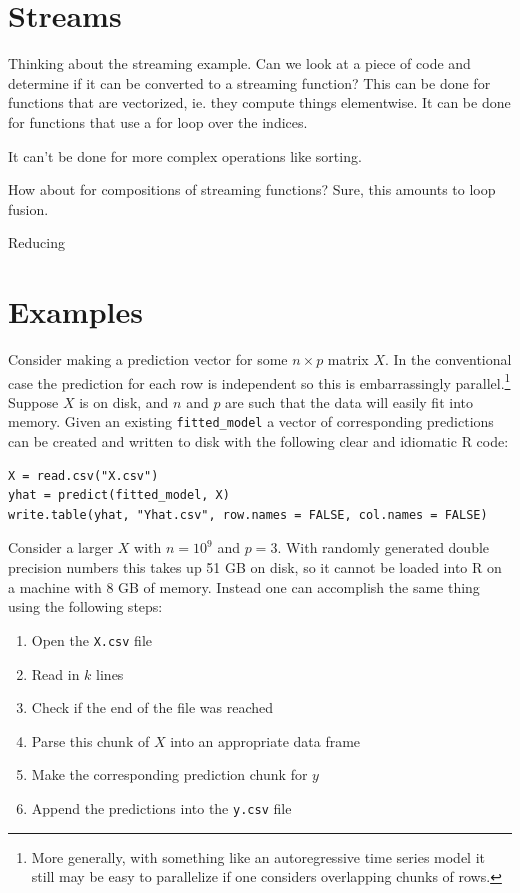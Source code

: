 \documentclass[12pt]{article}
\begin{document}
\section{Streams}

Thinking about the streaming example. Can we look at a
piece of code and determine if it can be converted to a streaming function?
This can be done for functions that are vectorized, ie. they compute things
elementwise. It can be done for functions that use a for loop over the
indices. 

It can't be done for more complex operations like sorting.

How about for compositions of streaming functions? Sure, this amounts to
loop fusion.

Reducing

\section{Examples}

Consider making a prediction vector for some $n \times p$ matrix $X$. In
the conventional case the prediction for each row is independent so this is
embarrassingly parallel.\footnote{More generally, with something like an
autoregressive time series model it still may be easy to parallelize if one
considers overlapping chunks of rows.} Suppose $X$ is on disk, and $n$ and
$p$ are such that the data will easily fit into memory.  Given an existing
\texttt{fitted\_model} a vector of corresponding predictions can be created
and written to disk with the following clear and idiomatic R code:

\begin{verbatim}
X = read.csv("X.csv")
yhat = predict(fitted_model, X)
write.table(yhat, "Yhat.csv", row.names = FALSE, col.names = FALSE)
\end{verbatim}

Consider a larger $X$ with $n = 10^{9}$ and $p = 3$. With randomly generated double
precision numbers this takes up 51 GB on disk, so it cannot be loaded into
R on a machine with 8 GB of memory. Instead one can accomplish the same
thing using the following steps:
\begin{enumerate}
    \item Open the \texttt{X.csv} file
    \item Read in $k$ lines
    \item Check if the end of the file was reached
    \item Parse this chunk of $X$ into an appropriate data frame
    \item Make the corresponding prediction chunk for $y$
    \item Append the predictions into the \texttt{y.csv} file
\end{enumerate}
\end{document}
